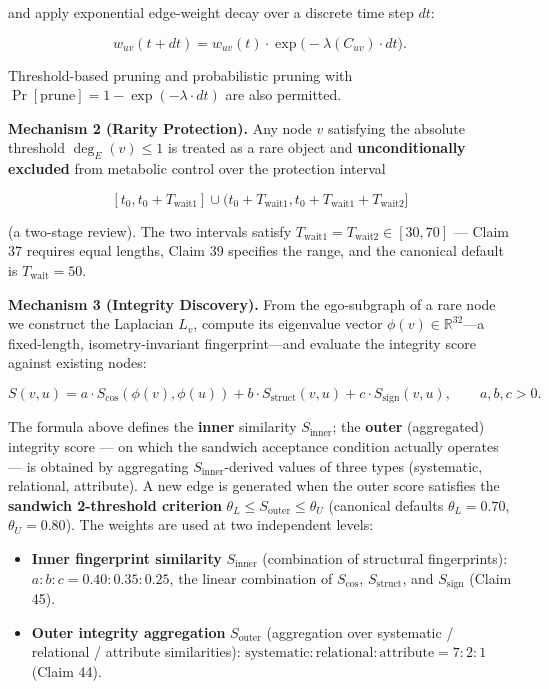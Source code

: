 and apply exponential edge-weight decay over a discrete time step \(dt\):

\[
w_{uv}(t + dt) = w_{uv}(t) \cdot \exp\bigl(-\lambda(C_{uv}) \cdot dt\bigr) .
\]

Threshold-based pruning and probabilistic pruning with \(\Pr[\text{prune}] = 1 - \exp(-\lambda \cdot dt)\) are also permitted.

\textbf{Mechanism 2 (Rarity Protection).} Any node \(v\) satisfying the absolute threshold \(\deg_E(v) \le 1\) is treated as a rare object and \textbf{unconditionally excluded} from metabolic control over the protection interval

\[
[t_0, t_0 + T_{\text{wait1}}] \cup (t_0 + T_{\text{wait1}}, t_0 + T_{\text{wait1}} + T_{\text{wait2}}]
\]

(a two-stage review). The two intervals satisfy \(T_{\text{wait1}} = T_{\text{wait2}} \in [30, 70]\) --- Claim 37 requires equal lengths, Claim 39 specifies the range, and the canonical default is \(T_{\text{wait}} = 50\).

\textbf{Mechanism 3 (Integrity Discovery).} From the ego-subgraph of a rare node we construct the Laplacian \(L_v\), compute its eigenvalue vector \(\phi(v) \in \mathbb{R}^{32}\)---a fixed-length, isometry-invariant fingerprint---and evaluate the integrity score against existing nodes:

\[
S(v, u) = a \cdot S_{\text{cos}}(\phi(v), \phi(u)) + b \cdot S_{\text{struct}}(v, u) + c \cdot S_{\text{sign}}(v, u), \qquad a, b, c > 0 .
\]

The formula above defines the \textbf{inner} similarity \(S_{\text{inner}}\); the \textbf{outer} (aggregated) integrity score --- on which the sandwich acceptance condition actually operates --- is obtained by aggregating \(S_{\text{inner}}\)-derived values of three types (systematic, relational, attribute). A new edge is generated when the outer score satisfies the \textbf{sandwich 2-threshold criterion} \(\theta_L \le S_{\text{outer}} \le \theta_U\) (canonical defaults \(\theta_L = 0.70\), \(\theta_U = 0.80\)). The weights are used at two independent levels:

\begin{itemize}
\tightlist
\item
  \textbf{Inner fingerprint similarity} \(S_{\text{inner}}\) (combination of structural fingerprints): \(a : b : c = 0.40 : 0.35 : 0.25\), the linear combination of \(S_{\text{cos}}\), \(S_{\text{struct}}\), and \(S_{\text{sign}}\) (Claim 45).
\item
  \textbf{Outer integrity aggregation} \(S_{\text{outer}}\) (aggregation over systematic / relational / attribute similarities): \(\text{systematic} : \text{relational} : \text{attribute} = 7 : 2 : 1\) (Claim 44).
\end{itemize}

